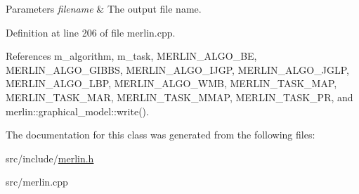\begin{DoxyParams}{Parameters}
{\em filename} & The output file name. \\
\hline
\end{DoxyParams}


Definition at line 206 of file merlin.\+cpp.



References m\+\_\+algorithm, m\+\_\+task, M\+E\+R\+L\+I\+N\+\_\+\+A\+L\+G\+O\+\_\+\+BE, M\+E\+R\+L\+I\+N\+\_\+\+A\+L\+G\+O\+\_\+\+G\+I\+B\+BS, M\+E\+R\+L\+I\+N\+\_\+\+A\+L\+G\+O\+\_\+\+I\+J\+GP, M\+E\+R\+L\+I\+N\+\_\+\+A\+L\+G\+O\+\_\+\+J\+G\+LP, M\+E\+R\+L\+I\+N\+\_\+\+A\+L\+G\+O\+\_\+\+L\+BP, M\+E\+R\+L\+I\+N\+\_\+\+A\+L\+G\+O\+\_\+\+W\+MB, M\+E\+R\+L\+I\+N\+\_\+\+T\+A\+S\+K\+\_\+\+M\+AP, M\+E\+R\+L\+I\+N\+\_\+\+T\+A\+S\+K\+\_\+\+M\+AR, M\+E\+R\+L\+I\+N\+\_\+\+T\+A\+S\+K\+\_\+\+M\+M\+AP, M\+E\+R\+L\+I\+N\+\_\+\+T\+A\+S\+K\+\_\+\+PR, and merlin\+::graphical\+\_\+model\+::write().



The documentation for this class was generated from the following files\+:\begin{DoxyCompactItemize}
\item 
src/include/\hyperlink{merlin_8h}{merlin.\+h}\item 
src/merlin.\+cpp\end{DoxyCompactItemize}
